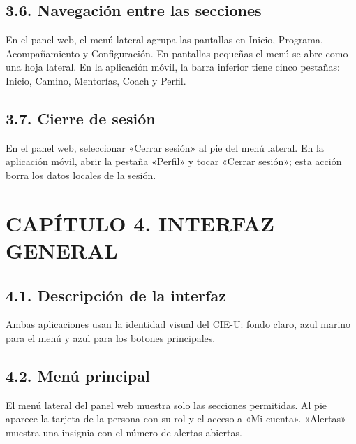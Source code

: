 \documentclass[12pt,letterpaper]{article}
\begin{document}
\subsection*{3.6. Navegación entre las secciones}


En el panel web, el menú lateral agrupa las pantallas en Inicio, Programa, Acompañamiento y Configuración. En pantallas pequeñas el menú se abre como una hoja lateral. En la aplicación móvil, la barra inferior tiene cinco pestañas: Inicio, Camino, Mentorías, Coach y Perfil.

\subsection*{3.7. Cierre de sesión}


En el panel web, seleccionar «Cerrar sesión» al pie del menú lateral. En la aplicación móvil, abrir la pestaña «Perfil» y tocar «Cerrar sesión»; esta acción borra los datos locales de la sesión.

\clearpage

\section*{CAPÍTULO 4. INTERFAZ GENERAL}


\subsection*{4.1. Descripción de la interfaz}


Ambas aplicaciones usan la identidad visual del CIE-U: fondo claro, azul marino para el menú y azul para los botones principales.

\subsection*{4.2. Menú principal}


El menú lateral del panel web muestra solo las secciones permitidas. Al pie aparece la tarjeta de la persona con su rol y el acceso a «Mi cuenta». «Alertas» muestra una insignia con el número de alertas abiertas.
\end{document}
